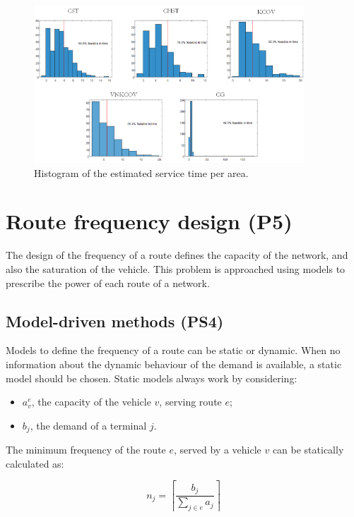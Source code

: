 \begin{figure}[hbt!]
\centering
\includegraphics[width=0.9\textwidth]{SectionDistribution/design_figures/fig_ROMA_time.png}
\captionsetup{type=figure}
\caption{Histogram of the estimated service time per area.}
\label{fig_ROMA_time}
\end{figure}

\section{Route frequency design (P5)}
The design of the frequency of a route defines the capacity of the network, and also the saturation of the vehicle. This problem is approached using models to prescribe the power of each route of a network.

\subsection{Model-driven methods (PS4)}
Models to define the frequency of a route can be static or dynamic. When no information about the dynamic behaviour of the demand is available, a static model should be chosen. Static models always work by considering:

\begin{itemize}
    \item $a_v^{e}$, the capacity of the vehicle $v$, serving route $e$;
    \item $b_j$, the demand of a terminal $j$.
\end{itemize}
The minimum frequency of the route $e$, served by a vehicle $v$ can be statically calculated as:

\begin{equation}
    n_j=\left\lceil\frac{b_j}{\sum_{j\in e} a_j}\right\rceil
\end{equation}

